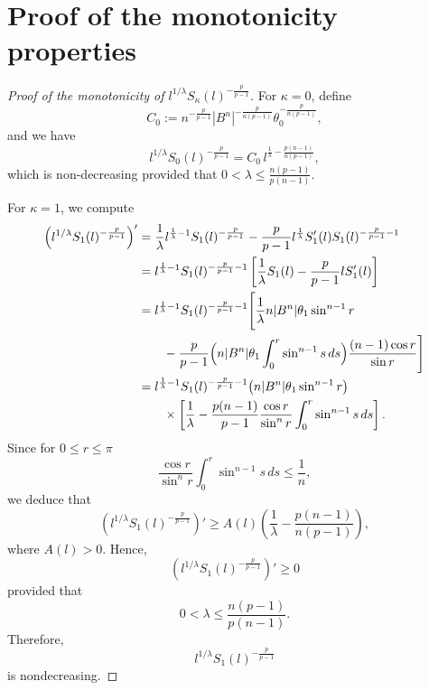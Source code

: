 \documentclass[11pt]{article}
\numberwithin{equation}{section}
\theoremstyle{definition}
\theoremstyle{remark}
\begin{document}
\section{Proof of the monotonicity properties}
\label{app:1}
\begin{proof}[Proof of the monotonicity of $l^{1/\lambda}S_\kappa(l)^{-\frac{p}{p-1}}$]
For $\kappa=0$, define
\[
C_0
:=
n^{-\frac{p}{p-1}}
|B^n|^{-\frac{p}{n(p-1)}}
\theta_0^{-\frac{p}{n(p-1)}},
\] 
and we have
\[
l^{1/\lambda}S_0(l)^{-\frac{p}{p-1}}
= C_0\,
l^{\frac{1}{\lambda}-\frac{p(n-1)}{n(p-1)}},
\]
which is non-decreasing provided that $0 < \lambda\le \frac{n(p-1)}{p(n-1)}$.

For $\kappa=1$, we compute
\begin{align}\label{eq:derivative-FS}
\left(l^{1/\lambda}S_1(l)^{-\frac{p}{p-1}}\right)'
&=
\frac1\lambda
l^{\frac1\lambda-1}
S_1(l)^{-\frac{p}{p-1}}
-\frac{p}{p-1}
l^{\frac1\lambda}
S_1'(l)
S_1(l)^{-\frac{p}{p-1}-1}
\\\notag
&=
l^{\frac1\lambda-1}
S_1(l)^{-\frac{p}{p-1}-1}
\left[
\frac1\lambda S_1(l)
-\frac{p}{p-1}lS_1'(l)
\right]
\\\notag
&=
l^{\frac1\lambda-1}
S_1(l)^{-\frac{p}{p-1}-1}
\Biggl[
\frac1\lambda
n|B^n|\theta_1
\sin^{n-1}r
\\\notag
&\qquad
-\frac{p}{p-1}
\Bigl(
n|B^n|\theta_1
\int_0^r\sin^{n-1}s\,ds
\Bigr)
\frac{(n-1)\cos r}{\sin r}
\Biggr]
\\\notag
&=
l^{\frac1\lambda-1}
S_1(l)^{-\frac{p}{p-1}-1}
\bigl(n|B^n|\theta_1\sin^{n-1}r\bigr)
\\\notag
&\qquad\times
\left[
\frac1\lambda
-\frac{p(n-1)}{p-1}
\frac{\cos r}{\sin^n r}
\int_0^r\sin^{n-1}s\,ds
\right].
\end{align}
Since for $0 \le r \le \pi$
\[
\frac{\cos r}{\sin^n r}
\int_0^r \sin^{n-1}s\,ds
\le \frac1n,
\]
we deduce that
\[
\left(l^{1/\lambda}S_1(l)^{-\frac{p}{p-1}}\right)'
\ge
A(l)
\left(
\frac1\lambda
-\frac{p(n-1)}{n(p-1)}
\right),
\]
where \(A(l)>0\). Hence,
\[
\left(l^{1/\lambda}S_1(l)^{-\frac{p}{p-1}}\right)'\ge0
\]
provided that
\[
0<\lambda\le \frac{n(p-1)}{p(n-1)}.
\]
Therefore,
\[
l^{1/\lambda}S_1(l)^{-\frac{p}{p-1}}
\]
is nondecreasing.
\end{proof}
\end{document}
